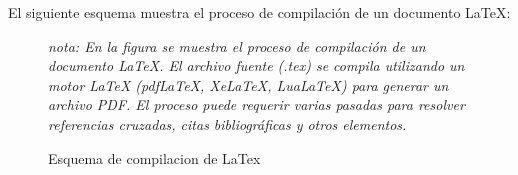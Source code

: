 \documentclass[10pt,twocolumn,a4paper]{article}
\begin{document}
    El siguiente esquema muestra el proceso de compilación de un documento LaTeX:
    \begin{figure}[!ht]
        \centering
        \caption{Esquema de compilacion de LaTex}
        \label{fig:LatexD}
    \textit{nota: En la figura se muestra el proceso de compilación de un documento LaTeX. El archivo fuente (.tex) se compila utilizando un motor LaTeX (pdfLaTeX, XeLaTeX, LuaLaTeX) para generar un archivo PDF. El proceso puede requerir varias pasadas para resolver referencias cruzadas, citas bibliográficas y otros elementos.}
    \end{figure} 
    
\end{document}
